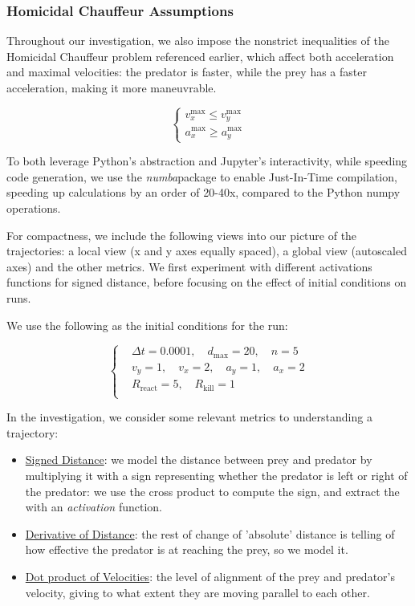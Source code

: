 \documentclass[11pt]{article}
\begin{document}
\subsubsection{Homicidal Chauffeur Assumptions}
Throughout our investigation, we also impose the nonstrict inequalities of the Homicidal Chauffeur problem referenced earlier, which affect both acceleration and maximal velocities: the predator is faster, while the prey has a faster acceleration, making it more maneuvrable.

\[
\left\{
\begin{aligned}
    v^{\text{max}}_x \leq v^{\text{max}}_y \\
    a^{\text{max}}_x \geq a^{\text{max}}_y
\end{aligned}
\right.
\]

To both leverage Python's abstraction and Jupyter's interactivity, while speeding code generation, we use the \textit{numba}package to enable Just-In-Time compilation, speeding up calculations by an order of 20-40x, compared to the Python numpy operations.

For compactness, we include the following views into our picture of the trajectories: a local view (x and y axes equally spaced), a global view (autoscaled axes) and the other metrics. We first experiment with different activations functions for signed distance, before focusing on the effect of initial conditions on runs.

We use the following as the initial conditions for the run:

\[
\left\{
\begin{aligned}
&\Delta t = 0.0001,\quad d_{\text{max}} = 20,\quad n = 5 \\
&v_y = 1, \quad v_x = 2, \quad a_y = 1, \quad a_x = 2 \\
&R_{\text{react}} = 5,\quad R_{\text{kill}} = 1 \\
\end{aligned}
\right.
\]

In the investigation, we consider some relevant metrics to understanding a trajectory:
\begin{itemize}
    \item \underline{Signed Distance}: we model the distance between prey and predator by multiplying it with a sign representing whether the predator is left or right of the predator: we use the cross product to compute the sign, and extract the with an \textit{activation} function.
    \item \underline{Derivative of Distance}: the rest of change of 'absolute' distance is telling of how effective the predator is at reaching the prey, so we model it.
    \item \underline{Dot product of Velocities}: the level of alignment of the prey and predator's velocity, giving to what extent they are moving parallel to each other.
\end{itemize}
\end{document}
